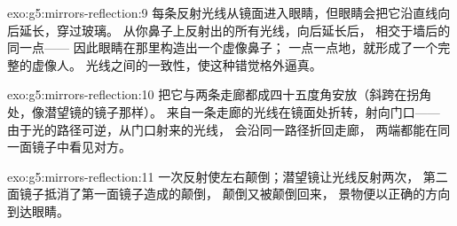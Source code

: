 \begin{solution}{exo:g5:mirrors-reflection:9}
每条反射光线从镜面进入眼睛，但眼睛会把它沿直线向后延长，穿过玻璃。
从你鼻子上反射出的所有光线，向后延长后，
相交于墙后的同一点——
因此眼睛在那里构造出一个虚像鼻子；
一点一点地，就形成了一个完整的虚像人。
光线之间的一致性，使这种错觉格外逼真。
\end{solution}

\begin{solution}{exo:g5:mirrors-reflection:10}
把它与两条走廊都成四十五度角安放（斜跨在拐角处，像潜望镜的镜子那样）。
来自一条走廊的光线在镜面处折转，射向门口——
由于光的路径可逆，从门口射来的光线，
会沿同一路径折回走廊，
两端都能在同一面镜子中看见对方。
\end{solution}

\begin{solution}{exo:g5:mirrors-reflection:11}
一次反射使左右颠倒；潜望镜让光线反射两次，
第二面镜子抵消了第一面镜子造成的颠倒，
颠倒又被颠倒回来，
景物便以正确的方向到达眼睛。
\end{solution}
